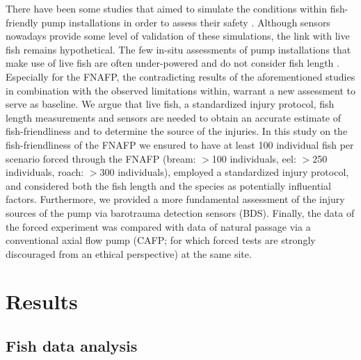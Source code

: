 \documentclass[fleqn,10pt]{wlscirep}
\begin{document}
There have been some studies that aimed to simulate the conditions within fish-friendly pump installations in order to assess their safety \cite{Pan2022FishApproach,Zhu2022APumps}. Although sensors nowadays provide some level of validation of these simulations, the link with live fish remains hypothetical. The few in-situ assessments of pump installations that make use of live fish are often under-powered and do not consider fish length \cite{Bierschenk2019FishPumps,Vriese2009OnderzoekBuisvijzel}. Especially for the FNAFP, the contradicting results of the aforementioned studies in combination with the observed limitations within, warrant a new assessment to serve as baseline. We argue that live fish, a standardized injury protocol, fish length measurements and sensors are needed to obtain an accurate estimate of fish-friendliness and to determine the source of the injuries. In this study on the fish-friendliness of the FNAFP we ensured to have at least 100 individual fish per scenario forced through the FNAFP (bream: $>$100 individuals, eel: $>$250 individuals, roach: $>$300 individuals), employed a standardized injury protocol, and considered both the fish length and the species as potentially influential factors. Furthermore, we provided a more fundamental assessment of the injury sources of the pump via barotrauma detection sensors (BDS). Finally, the data of the forced experiment was compared with data of natural passage via a conventional axial flow pump (CAFP; for which forced tests are strongly discouraged from an ethical perspective) at the same site.

\section*{Results}

\subsection*{Fish data analysis}
\end{document}
